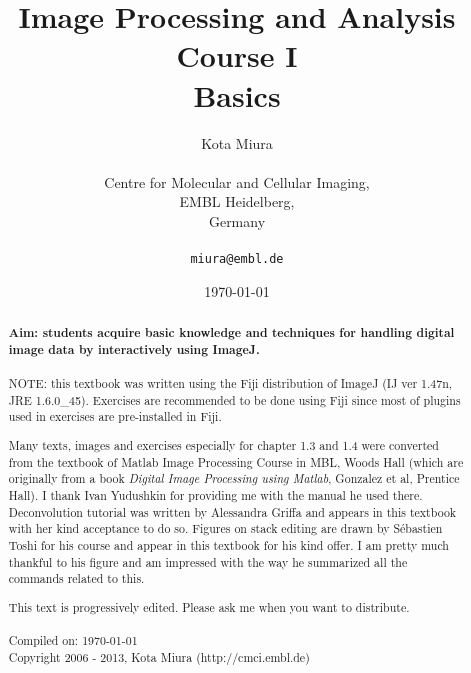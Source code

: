 \title{Image Processing and Analysis Course I\\
Basics}
\author{Kota Miura\\
\\
  Centre for Molecular and Cellular Imaging,\\
  EMBL Heidelberg,\\
  Germany\\
\\
\texttt{miura@embl.de}
}

\date{\today}

\pagestyle{empty}
\titleTH
\clearpage
\pagestyle{fancyplain}
\begin{abstract}
\HRule

\textbf{Aim: students acquire basic knowledge and techniques for handling
digital image data by interactively using ImageJ.} \\
\\

NOTE: this textbook was written using the Fiji distribution of ImageJ (IJ ver 1.47n, JRE 1.6.0\_45).
Exercises are recommended to be done using Fiji since most of plugins used in
exercises are pre-installed in Fiji.

Many texts, images and exercises especially for chapter 1.3 and 1.4 were
converted from the textbook of Matlab Image Processing Course in MBL, Woods Hall
(which are originally from a book \textit{Digital Image Processing
using Matlab}, Gonzalez et al, Prentice Hall). I thank Ivan Yudushkin for
providing me with the manual he used there.
Deconvolution tutorial was written by Alessandra Griffa and appears in this
textbook with her kind acceptance to do so.
Figures on stack editing are drawn by S\'{e}bastien Toshi for his course and appear in this textbook for his kind offer. I am pretty much thankful to his figure and am impressed with the way he summarized all the commands related to this. 


This text is progressively edited. Please ask me when you want to distribute. \\
\\
Compiled on: \today \\
Copyright 2006 - 2013, Kota Miura (http://cmci.embl.de)

\HRule
\end{abstract}